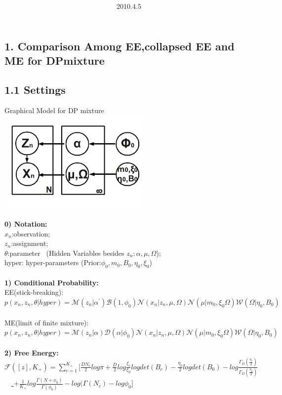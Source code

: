 \documentclass{article}
\title{\vspace{0.3in}\textmd{\textbf{\hmwkTitle}}}
\date{2010.4.5}
\author{\textbf{\hmwkAuthorName}}
\begin{document}
\begin{spacing}{1.1}
\maketitle



  
\section{1. Comparison Among EE,collapsed EE and ME for DPmixture}
\subsection{1.1 Settings}


\begin{center}
 Graphical Model for DP mixture\\
    \includegraphics[width=3in,height=2in]{dp.jpg} 
\end{center}
 


\large {\bf 0) Notation:}\\
  $x_{n}$:observation;\\
  $z_{n}$:assignment;\\
  $\theta$:parameter \  (Hidden Variables besides $z_{n}:\alpha,\mu,\Omega$);\\
  hyper: hyper-parameters (Prior:$\phi_{0},m_{0},B_{0},\eta_{0},\xi_{0}$)\\ \\
\large {\bf 1) Conditional Probability:} \\
EE(stick-breaking):\\$p(x_{n},z_{n},\theta|hyper)=\mathcal{M}(z_{n}|\alpha^{'})\mathcal{B}(1,\phi_{0})\mathcal{N}(x_{n}|z_{n},\mu,\Omega)
\mathcal{N}(\mu|m_{0},\xi_{0}\Omega)\mathcal{W}(\Omega|\eta_{0},B_{0})$\\ \\
ME(limit of finite mixture):\\$p(x_{n},z_{n},\theta|hyper)=\mathcal{M}(z_{n}|\alpha)\mathcal{D}(\alpha|\phi_{0})\mathcal{N}(x_{n}|z_{n},\mu,\Omega)
\mathcal{N}(\mu|m_{0},\xi_{0}\Omega)\mathcal{W}(\Omega|\eta_{0},B_{0})$\\ \\
\large {\bf 2) Free Energy:} \\
$\mathcal{F}([z],K_{+})=\sum_{c=1}^{K_{+}}[\frac{DN_{c}}{2}log\pi+\frac{D}{2}log\frac{\xi_{c}}{\xi_{0}}log det(B_{c})
-\frac{\eta_{0}}{2}log det(B_{0})-log \frac{\Gamma_{D}(\frac{\eta_{c}}{2})}{\Gamma_{D}(\frac{\eta_{0}}{2})}$\\
\ \  \underline{ $+\frac{1}{K_{+}}log \frac{\Gamma(N+\phi_{0})}{\Gamma(\phi_{0})} -log(\Gamma(N_{c})-log \phi_{0}]$}


\end{spacing}
\end{document}
